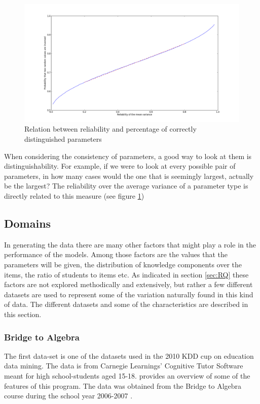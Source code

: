 \documentclass{scrartcl}
\begin{document}
\begin{figure}
\includegraphics[width=\textwidth]{images/reliVSprob2.png}
\caption{Relation between reliability and percentage of correctly distinguished parameters}
\label{fig:reli}
\end{figure}

When considering the consistency of parameters, a good way to look at them is distinguishability. For example, if we were to look at every possible pair of parameters, in how many cases would the one that is seemingly largest, actually be the largest? The reliability over the average variance of a parameter type is directly related to this measure (see figure \ref{fig:reli})

\subsection{Domains}
\label{sec:domain}
In generating the data there are many other factors that might play a role in the performance of the models. Among those factors are the values that the parameters will be given, the distribution of knowledge components over the items, the ratio of students to items etc. As indicated in section \ref{sec:RQ} these factors are not explored methodically and extensively, but rather a few different datasets are used to represent some of the variation naturally found in this kind of data. The different datasets and some of the characteristics are described in this section.

\subsubsection{Bridge to Algebra}
The first data-set is one of the datasets used in the 2010 KDD cup on education data mining. The data is from Carnegie Learnings' Cognitive Tutor Software meant for high school-students aged 15-18. \cite{ct} provides an overview of some of the features of this program. The data was obtained from the Bridge to Algebra course during the school year 2006-2007 \cite{bridge}. 
\end{document}
